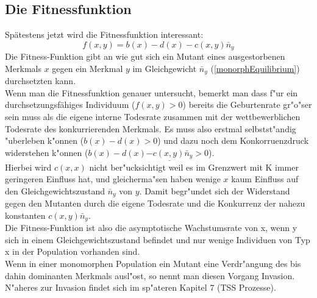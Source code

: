 \documentclass[11pt, a4paper, german]{article}
\theoremstyle{plain}
\begin{document}
	\subsection{Die Fitnessfunktion}
		Spätestens jetzt wird die Fitnessfunktion interessant:
		\[ f(x,y) = b(x) - d(x) - c(x,y)\bar{n}_y \]
		Die Fitness-Funktion gibt an wie gut sich ein Mutant eines ausgestorbenen Merkmals $ x $ gegen ein Merkmal $ y $ im Gleichgewicht $ \bar{n}_y $ (\ref{monorphEquilibrium}) durchsetzten kann. \\
		Wenn man die Fitnessfunktion genauer untersucht, bemerkt man dass f"ur ein durchsetzungsfähiges Individuum ($ f(x,y) > 0 $) bereits die Geburtenrate gr"o"ser sein muss als die eigene interne Todesrate zusammen mit der wettbewerblichen Todesrate des konkurrierenden Merkmals. Es muss also erstmal selbstst"andig "uberleben k"onnen ($ b(x) - d(x) > 0 $) und dazu noch dem Konkorruenzdruck widerstehen k"onnen ($ b(x) - d(x) \underline{- c(x,y)\bar{n}_y} > 0 $).\\
		Hierbei wird $ c(x,x) $ nicht ber"ucksichtigt weil es im Grenzwert mit K immer geringeren Einfluss hat, und gleicherma"sen haben wenige $ x  $ kaum Einfluss auf den Gleichgewichtszustand $ \bar{n}_y $ von $ y $. Damit begr"undet sich der Widerstand gegen den Mutanten durch die eigene Todesrate und die Konkurrenz der nahezu konstanten $ c(x,y)\bar{n}_y $. \\
		Die Fitness-Funktion ist also die asymptotische Wachstumsrate von x, wenn y sich in einem Gleichgewichtszustand befindet und nur wenige Individuen von Typ x in der Population vorhanden sind.\\
		Wenn in einer monomorphen Population ein Mutant eine Verdr"angung des bis dahin dominanten Merkmals ausl"ost, so nennt man diesen Vorgang Invasion. N"aheres zur Invasion findet sich im sp"ateren Kapitel 7 (TSS Prozesse).
	
\end{document}
